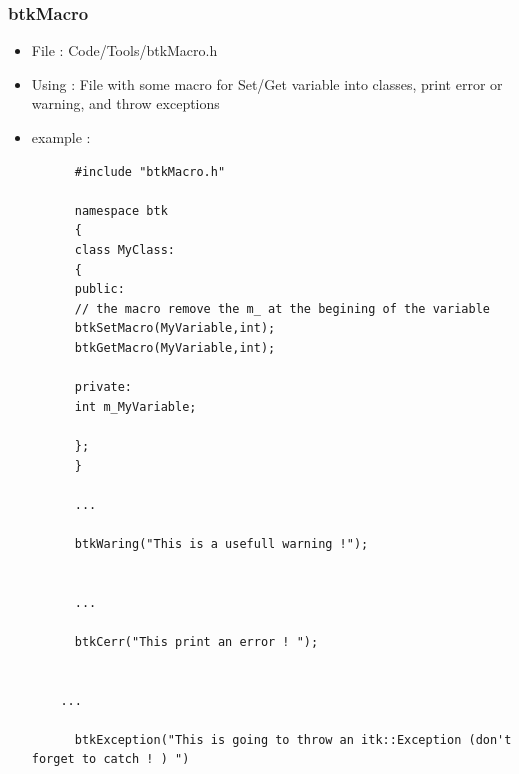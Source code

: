     \subsubsection{btkMacro}
    \begin{itemize}
    \item File : Code/Tools/btkMacro.h
    \item Using : File with some macro for Set/Get variable into classes, print error or warning, and throw exceptions
    \item example :
      \begin{verbatim}
      #include "btkMacro.h"

      namespace btk
      {
      class MyClass:
      {
      public:
      // the macro remove the m_ at the begining of the variable
      btkSetMacro(MyVariable,int); 
      btkGetMacro(MyVariable,int);

      private:
      int m_MyVariable;

      };
      }

      ...

      btkWaring("This is a usefull warning !");


      ...
      
      btkCerr("This print an error ! ");


    ... 
    
      btkException("This is going to throw an itk::Exception (don't forget to catch ! ) ")

      \end{verbatim}


    \end{itemize}
